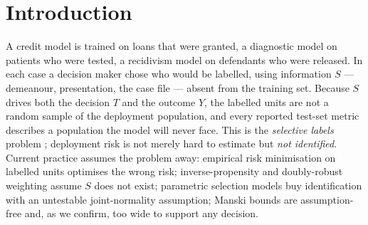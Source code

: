 \section{Introduction}
\label{sec:intro}

A credit model is trained on loans that were granted, a diagnostic model on
patients who were tested, a recidivism model on defendants who were released.
In each case a decision maker chose who would be labelled, using information
$S$ --- demeanour, presentation, the case file --- absent from the training
set. Because $S$ drives both the decision $T$ and the outcome $Y$, the labelled
units are not a random sample of the deployment population, and every reported
test-set metric describes a population the model will never face. This is the
\emph{selective labels} problem \citep{lakkaraju2017selective,
kleinberg2018human}; deployment risk is not merely hard to estimate but
\emph{not identified}. Current practice assumes the problem away: empirical
risk minimisation on labelled units optimises the wrong risk; inverse-propensity
and doubly-robust weighting \citep{robins1994estimation,
chernozhukov2018double} assume $S$ does not exist; parametric selection models
\citep{heckman1979sample} buy identification with an untestable
joint-normality assumption; Manski bounds \citep{manski1990nonparametric} are
assumption-free and, as we confirm, too wide to support any decision.

